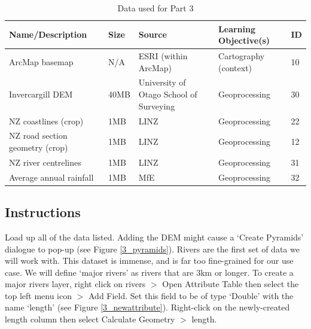 \documentclass{article}
\begin{document}
\begin{table}[h]
\begin{center}
    \begin{tabular}{ | m{4cm} | m{1cm}| m{3.5cm} | m{5cm} | m{1cm} | } 
    \hline
    \cellcolor{red!35!blue!33!green!33!}\textbf{Name/Description} & 
    \cellcolor{red!35!blue!33!green!33!}\textbf{Size} &
    \cellcolor{red!35!blue!33!green!33!}\textbf{Source} &
    \cellcolor{red!35!blue!33!green!33!}\textbf{Learning Objective(s)} &
    \cellcolor{red!35!blue!33!green!33!}\textbf{ID} \\
    \hline
    ArcMap basemap & N/A & ESRI (within ArcMap) & Cartography (context) & 10 \\
    \hline
    Invercargill DEM & 40MB & University of Otago School of Surveying & Geoprocessing & 30 \\
    \hline
    NZ coastlines (crop) & 1MB & LINZ & Geoprocessing & 22 \\
    \hline
    NZ road section geometry (crop) & 1MB & LINZ & Geoprocessing & 12 \\
    \hline
    NZ river centrelines & 1MB & LINZ & Geoprocessing & 31 \\
    \hline
    Average annual rainfall & 1MB & MfE & Geoprocessing & 32 \\
    \hline
    \end{tabular}
\end{center}
\caption{\label{tb_data_3}Data used for Part 3}
\end{table}

\pagebreak

\subsection{Instructions}
Load up all of the data listed. Adding the DEM might cause a `Create Pyramids' dialogue to pop-up (see Figure \ref{3_pyramids}). Rivers are the first set of data we will work with. This dataset is immense, and is far too fine-grained for our use case. We will define `major rivers' as rivers that are 3km or longer. To create a major rivers layer, right click on rivers $>$ Open Attribute Table then select the top left menu icon $>$ Add Field. Set this field to be of type `Double' with the name `length' (see Figure \ref{3_newattribute}). Right-click on the newly-created length column then select Calculate Geometry $>$ length. 
\end{document}
